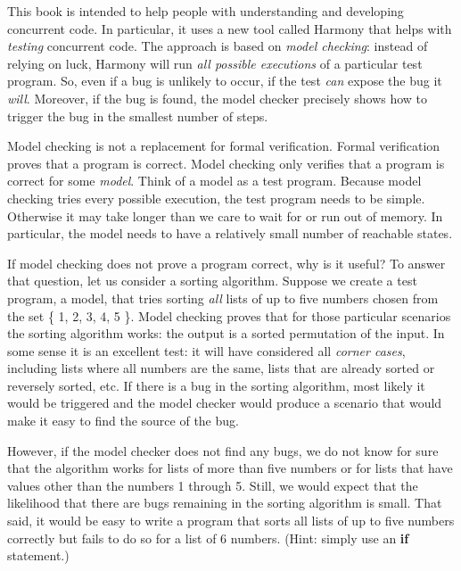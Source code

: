 \documentclass{report}
\begin{document}
This book is intended to help people with understanding and
developing concurrent code.  In particular, it uses a new tool
called Harmony that helps with \emph{testing} concurrent code.
The approach is based on \emph{model checking}:
%
instead of relying
on luck, Harmony will run \emph{all possible executions} of a particular
test program.  So, even if a bug is unlikely to occur, if the test
\emph{can} expose the bug it \emph{will}.  Moreover, if the bug is
found, the model checker precisely shows how to trigger the bug in
the smallest number of steps.

Model checking is not a replacement for formal verification.
%
Formal verification proves that a program is correct.  Model checking only
verifies that a program is correct for some \emph{model}.  Think of
a model as a test program.
Because model checking tries every possible execution, the test
program needs to be simple. Otherwise it may take longer than we
care to wait for or run out of memory.
In particular, the model needs to have a relatively small number of
reachable states.

If model checking does not prove a program correct, why is it
useful?
To answer that question, let us consider a sorting algorithm.
Suppose we create a test program, a model, that tries sorting
\emph{all} lists of up to five numbers chosen from the set
\{ 1, 2, 3, 4, 5 \}.  Model checking proves that for those particular
scenarios the sorting algorithm works: the output is a sorted
permutation of the input.  In some sense it is an excellent test:
it will have considered all \emph{corner cases},
%
including lists where all
numbers are the same, lists that are already sorted or reversely
sorted, etc.  If there is a bug in the sorting algorithm, most
likely it would be triggered and the model checker would produce a
scenario that would make it easy to find the source of the bug.

However, if the model checker does not find any bugs, we do not
know for sure that the algorithm works for lists of more than
five numbers or for lists that have values other than the numbers
1 through 5.  Still, we would expect that the likelihood that there
are bugs remaining in the sorting algorithm is small.
That said, it would be easy to write a program
that sorts all lists of up to five numbers correctly but fails to
do so for a list of 6 numbers.  (Hint: simply use an \textbf{if}
statement.)

%
\end{document}
